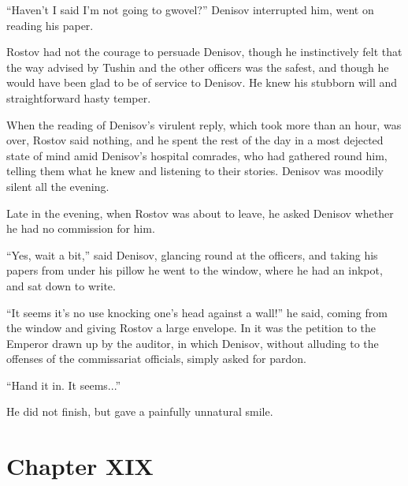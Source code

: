``Haven't I said I'm not going to gwovel?'' Denisov interrupted
him, went on reading his paper.

Rostov had not the courage to persuade Denisov, though he
instinctively felt that the way advised by Tushin and the other
officers was the safest, and though he would have been glad to be
of service to Denisov.  He knew his stubborn will and
straightforward hasty temper.

When the reading of Denisov's virulent reply, which took more
than an hour, was over, Rostov said nothing, and he spent the
rest of the day in a most dejected state of mind amid Denisov's
hospital comrades, who had gathered round him, telling them what
he knew and listening to their stories. Denisov was moodily
silent all the evening.

Late in the evening, when Rostov was about to leave, he asked
Denisov whether he had no commission for him.

``Yes, wait a bit,'' said Denisov, glancing round at the
officers, and taking his papers from under his pillow he went to
the window, where he had an inkpot, and sat down to write.

``It seems it's no use knocking one's head against a wall!'' he
said, coming from the window and giving Rostov a large
envelope. In it was the petition to the Emperor drawn up by the
auditor, in which Denisov, without alluding to the offenses of
the commissariat officials, simply asked for pardon.

``Hand it in. It seems...''

He did not finish, but gave a painfully unnatural smile.


\chapter*{Chapter XIX}
\ifaudio     
{} 
\fi

